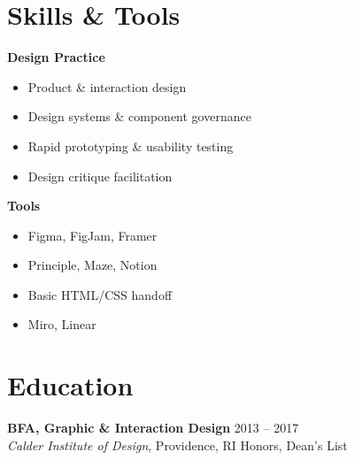 \documentclass[10pt]{article}
\begin{document}
\section{Skills \& Tools}

\noindent
\begin{minipage}[t]{0.48\linewidth}
\textbf{Design Practice}
\begin{itemize}
  \item Product \& interaction design
  \item Design systems \& component governance
  \item Rapid prototyping \& usability testing
  \item Design critique facilitation
\end{itemize}
\end{minipage}\hfill
\begin{minipage}[t]{0.48\linewidth}
\textbf{Tools}
\begin{itemize}
  \item Figma, FigJam, Framer
  \item Principle, Maze, Notion
  \item Basic HTML/CSS handoff
  \item Miro, Linear
\end{itemize}
\end{minipage}
\par

\section{Education}

\noindent\textbf{BFA, Graphic \& Interaction Design} \hfill {\small\color{slate}2013 -- 2017}\\
{\color{accent}\itshape Calder Institute of Design}, Providence, RI \hfill {\small\color{slate}Honors, Dean's List}
\end{document}
